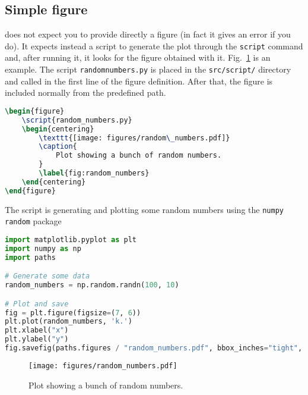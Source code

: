 \documentclass{aa}
\begin{document}
\subsection{Simple figure}
\showyourwork does not expect you to provide directly a figure (in fact it gives an error if you do).
It expects instead a script to generate the plot through the \texttt{script} command and, after running it, it looks for the figure obtained with it.
Fig.~\ref{fig:random_numbers} is an example. The script \texttt{randomnumbers.py} is placed in the \texttt{src/script/} directory and called in the first line of the figure definition. After that, the figure is included normally from the predefined path.
\begin{lstlisting}[language=TeX]
\begin{figure}
    \script{random_numbers.py}
    \begin{centering}
        \texttt{[image: figures/random\_numbers.pdf]}
        \caption{
            Plot showing a bunch of random numbers.
        }
        \label{fig:random_numbers}
    \end{centering}
\end{figure}
\end{lstlisting}
The script is generating and plotting some random numbers using the \texttt{numpy random} package 
\begin{lstlisting}[language=python]
import matplotlib.pyplot as plt
import numpy as np
import paths

# Generate some data
random_numbers = np.random.randn(100, 10)

# Plot and save
fig = plt.figure(figsize=(7, 6))
plt.plot(random_numbers, 'k.')
plt.xlabel("x")
plt.ylabel("y")
fig.savefig(paths.figures / "random_numbers.pdf", bbox_inches="tight", dpi=300)
\end{lstlisting}

\begin{figure}
    \begin{centering}
        \texttt{[image: figures/random\_numbers.pdf]}
        \caption{
            Plot showing a bunch of random numbers.
        }
        \label{fig:random_numbers}
    \end{centering}
\end{figure}
\end{document}
